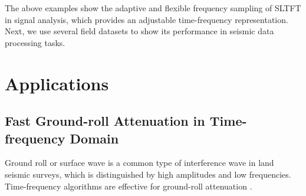 
The above examples show the adaptive and flexible frequency sampling
of SLTFT in signal analysis, which provides an adjustable
time-frequency representation. Next, we use several field datasets to
show its performance in seismic data processing tasks.

\section{Applications}
\subsection{Fast Ground-roll Attenuation in Time-frequency Domain}
Ground roll or surface wave is a common type of interference wave in
land seismic surveys, which is distinguished by high amplitudes and
low frequencies. Time-frequency algorithms are effective for
ground-roll attenuation \cite[]{elboth2010}.

